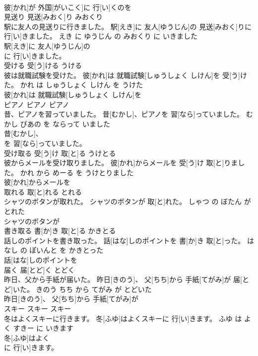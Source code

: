 \documentclass[8pt]{extreport}
\begin{document}
\begin{CJK}{UTF8}{min}
\\	彼[かれ]が 外国[がいこく]に 行[い]くのを
\\	見送り	見送[みおく]り	みおくり	
\\	駅に友人の見送りに行きました。	駅[えき]に 友人[ゆうじん]の 見送[みおく]りに 行[い]きました。	えき に ゆうじん の みおくり に いきました	
\\	駅[えき]に 友人[ゆうじん]の
\\	に 行[い]きました。			
\\	受ける	受[う]ける	うける	
\\	彼は就職試験を受けた。	彼[かれ]は 就職試験[しゅうしょく しけん]を 受[う]けた。	かれ は しゅうしょく しけん を うけた	
\\	彼[かれ]は 就職試験[しゅうしょく しけん]を
\\	ピアノ	ピアノ	ピアノ	
\\	昔、ピアノを習っていました。	昔[むかし]、ピアノを 習[なら]っていました。	むかし ぴあの を ならって いました	
\\	昔[むかし]、
\\	を 習[なら]っていました。			
\\	受け取る	受[う]け 取[と]る	うけとる	
\\	彼からメールを受け取りました。	彼[かれ]からメールを 受[う]け 取[と]りました。	かれ から めーる を うけとりました	
\\	彼[かれ]からメールを
\\	取れる	取[と]れる	とれる	
\\	シャツのボタンが取れた。	シャツのボタンが 取[と]れた。	しゃつ の ぼたん が とれた	
\\	シャツのボタンが
\\	書き取る	書[か]き 取[と]る	かきとる	
\\	話しのポイントを書き取った。	話[はな]しのポイントを 書[か]き 取[と]った。	はなし の ぽいんと を かきとった	
\\	話[はな]しのポイントを
\\	届く	届[とど]く	とどく	
\\	昨日、父から手紙が届いた。	昨日[きのう]、 父[ちち]から 手紙[てがみ]が 届[とど]いた。	きのう ちち から てがみ が とどいた	
\\	昨日[きのう]、 父[ちち]から 手紙[てがみ]が
\\	スキー	スキー	スキー	
\\	冬はよくスキーに行きます。	冬[ふゆ]はよくスキーに 行[い]きます。	ふゆ は よく すきー に いきます	
\\	冬[ふゆ]はよく
\\	に 行[い]きます。			

\end{CJK}
\end{document}
